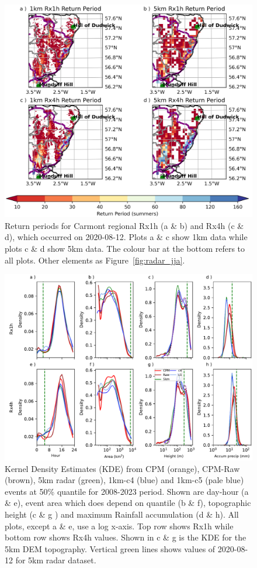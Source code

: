 \documentclass[11pt,a4paper]{article}
\begin{document}
\begin{figure}
	\centering
	\includegraphics[width=\linewidth]{map_return_prds}
	\caption{Return periods for Carmont regional Rx1h (a \& b) and Rx4h (c \& d), which occurred on 2020-08-12. Plots a \& c show 1km data while plots c \& d show 5km data. The colour bar at the bottom refers to all plots. Other elements as Figure~\ref{fig:radar_jja}. } 
	\label{fig:map_rtn_prd}
\end{figure}


\begin{figure}
	\centering
	\includegraphics[width=\linewidth]{kde_smooth_events}
	\caption{Kernel Density Estimates (KDE) from  CPM (orange), CPM-Raw (brown), 5km radar (green), 1km-c4 (blue) and 1km-c5 (pale blue) events at 50\% quantile for 2008-2023 period.
		 Shown are day-hour (a \& e), event area which does depend on quantile (b \& f),  topographic height (c \& g ) and maximum Rainfall accumulation (d \& h). All plots, except a \& e, use a log x-axis. 
		  Top row shows Rx1h while bottom row shows Rx4h values. Shown in c \& g is the KDE for the 5km DEM topography. Vertical green lines shows values of 2020-08-12 for 5km radar dataset.}
	\label{fig:kde_smooth_events}
\end{figure}
\end{document}
